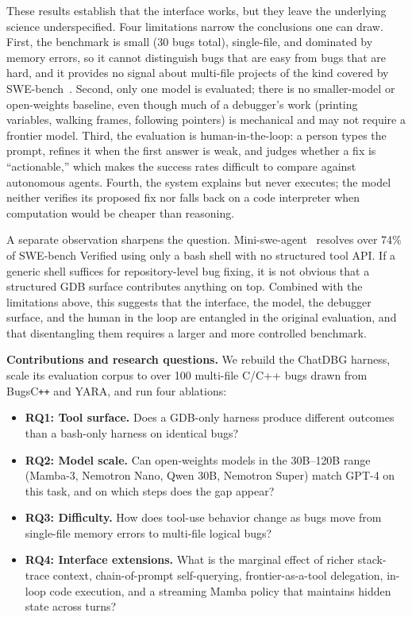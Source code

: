 \documentclass[11pt]{article}
\begin{document}
These results establish that the interface works, but they leave the underlying science underspecified. Four limitations narrow the conclusions one can draw. First, the benchmark is small (30 bugs total), single-file, and dominated by memory errors, so it cannot distinguish bugs that are easy from bugs that are hard, and it provides no signal about multi-file projects of the kind covered by SWE-bench~\cite{jimenez2024swebench}. Second, only one model is evaluated; there is no smaller-model or open-weights baseline, even though much of a debugger's work (printing variables, walking frames, following pointers) is mechanical and may not require a frontier model. Third, the evaluation is human-in-the-loop: a person types the prompt, refines it when the first answer is weak, and judges whether a fix is ``actionable,'' which makes the success rates difficult to compare against autonomous agents. Fourth, the system explains but never executes; the model neither verifies its proposed fix nor falls back on a code interpreter when computation would be cheaper than reasoning.

A separate observation sharpens the question. Mini-swe-agent~\cite{yang2024sweagent} resolves over 74\% of SWE-bench Verified using only a bash shell with no structured tool API. If a generic shell suffices for repository-level bug fixing, it is not obvious that a structured GDB surface contributes anything on top. Combined with the limitations above, this suggests that the interface, the model, the debugger surface, and the human in the loop are entangled in the original evaluation, and that disentangling them requires a larger and more controlled benchmark.

\medskip
\noindent
\textbf{Contributions and research questions.} We rebuild the ChatDBG harness, scale its evaluation corpus to over 100 multi-file C/C++ bugs drawn from BugsC\texttt{++} and YARA, and run four ablations:

\begin{itemize}
    \item \textbf{RQ1: Tool surface.} Does a GDB-only harness produce different outcomes than a bash-only harness on identical bugs?
    \item \textbf{RQ2: Model scale.} Can open-weights models in the 30B--120B range (Mamba-3, Nemotron Nano, Qwen 30B, Nemotron Super) match GPT-4 on this task, and on which steps does the gap appear?
    \item \textbf{RQ3: Difficulty.} How does tool-use behavior change as bugs move from single-file memory errors to multi-file logical bugs?
    \item \textbf{RQ4: Interface extensions.} What is the marginal effect of richer stack-trace context, chain-of-prompt self-querying, frontier-as-a-tool delegation, in-loop code execution, and a streaming Mamba policy that maintains hidden state across turns?
\end{itemize}
\end{document}

